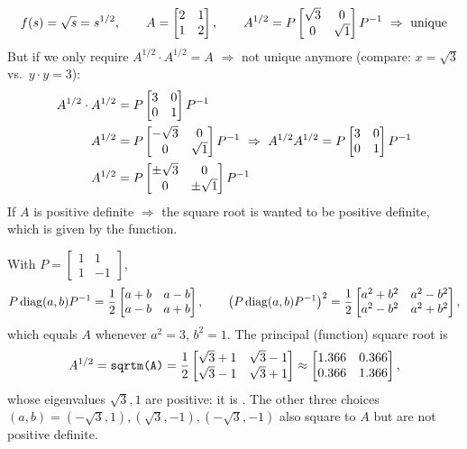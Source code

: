 \begin{example}
\[
f(s) = \sqrt{s} = s^{1/2},
\qquad
A = \bmat{2&1\\1&2},
\qquad
A^{1/2} = P\bmat{\sqrt3 & 0\\ 0 & \sqrt1}P^{-1} \ \Rightarrow\ \text{unique}
\]
But if we only require $A^{1/2}\cdot A^{1/2} = A$ $\Rightarrow$ not unique anymore (compare: $x = \sqrt3$ vs.\ $y\cdot y = 3$):
\begin{align*}
A^{1/2}\cdot A^{1/2} &= P\bmat{3&0\\0&1}P^{-1}\\
A^{1/2} &= P\bmat{-\sqrt3 & 0\\ 0 & \sqrt1}P^{-1} \ \Rightarrow\ A^{1/2}A^{1/2} = P\bmat{3&0\\0&1}P^{-1}\\
A^{1/2} &= P\bmat{\pm\sqrt3 & 0\\ 0 & \pm\sqrt1}P^{-1}
\end{align*}
If $A$ is positive definite $\Rightarrow$ the square root is wanted to be positive definite, which is given by the function.
\end{example}
\begin{insight}
With $P=\left[\begin{smallmatrix}1&1\\1&-1\end{smallmatrix}\right]$,
\[
P\operatorname{diag}(a,b)P^{-1}=\frac12\begin{bmatrix}a+b&a-b\\a-b&a+b\end{bmatrix},
\qquad
\bigl(P\operatorname{diag}(a,b)P^{-1}\bigr)^2=\frac12\begin{bmatrix}a^2+b^2&a^2-b^2\\a^2-b^2&a^2+b^2\end{bmatrix},
\]
which equals $A$ whenever $a^2=3$, $b^2=1$. The principal (function) square root is
\[
A^{1/2} = \text{\texttt{sqrtm(A)}} =\frac12\begin{bmatrix}\sqrt3+1 & \sqrt3-1\\ \sqrt3-1 & \sqrt3+1\end{bmatrix}\approx\begin{bmatrix}1.366&0.366\\0.366&1.366\end{bmatrix},
\]
whose eigenvalues $\sqrt3,1$ are positive: it is . The other three choices $(a,b)=(-\sqrt3,1),(\sqrt3,-1),(-\sqrt3,-1)$ also square to $A$ but are not positive definite.
\end{insight}
